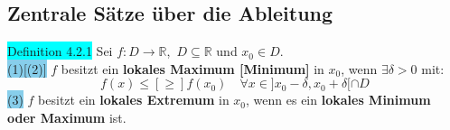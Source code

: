 \documentclass[landscape, 10pt]{article}
\newcommand{\R}{\mathbb{R}}
\begin{document}
\begin{multicols}{3}
       \subsection{Zentrale Sätze über die Ableitung}
              \colorbox{cyan}{Definition 4.2.1} 
                     Sei \textcolor{NavyBlue}{
                     $f:D\longrightarrow\R$},\,
                     \textcolor{NavyBlue}{$D\subseteq\R$}
                     und \textcolor{NavyBlue}{$x_0\in D$}. \\
                     \colorbox{SkyBlue}{(1)[(2)]}
                            \textcolor{NavyBlue}{$f$} 
                            besitzt ein 
                            \textbf{lokales Maximum [Minimum]} in 
                            \textcolor{NavyBlue}{$x_0$}, wenn 
                            \textcolor{NavyBlue}{
                            $\exists\delta>0$} mit: 
                            \begin{equation*}
                                   f(x)\leqslant[\geqslant] 
                                   f(x_0)\quad
                                   \forall x
                                   \in]x_0-\delta,x_0+\delta[
                                   \cap D
                            \end{equation*}
                     \colorbox{SkyBlue}{(3)} 
                            $f$ besitzt ein 
                            \textbf{lokales Extremum} 
                            in \textcolor{NavyBlue}{$x_0$}, 
                            wenn es ein 
                            \textbf{lokales Minimum oder 
                            Maximum} ist. \\


\end{multicols}
\end{document}
